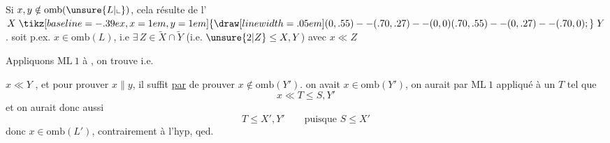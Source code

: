 Si $x,y\notin\mathrm{omb}(\unsure{L|\llcorner})$, cela résulte de l' $X\mathrel{\tikz[baseline=-.39ex,x=1em,y=1em]{\draw[line width=.05em] (0,.55)--(.70,.27)--(0,0) (.70,.55)--(0,.27)--(.70,0);}}Y$.   \unsure{)|,} soit p.ex. $x\in\mathrm{omb}(L)$,  i.e $\exists\,Z\in\widetilde X\cap\widetilde Y$ (i.e. $\unsure{2|Z}\leq X,Y$) avec $x\ll Z$

\unsure{[}Appliquons $\mathrm{ML}\ 1$ à
, on trouve 
i.e.
\deleted{donc $S\in\widetilde L\overset{\mathrm{def}}{=}\widetilde X\cap\widetilde Y$]}

  $x\ll Y$ , et pour prouver  $x\parallel y$, il suffit \uline{par}  de prouver $x\notin\mathrm{omb}(Y')$.   on avait $x\in\mathrm{omb}(Y')$, on aurait par $\mathrm{ML}\ 1$ appliqué à
un $T$ \deleted{\unsure{$\in$}} tel que
\[
 x\ll T\leq S,Y'
\]
et on aurait donc aussi
\[
 T\leq X',Y'\qquad\text{puisque } S\leq X'
\]
donc $x\in\mathrm{omb}(L')$, contrairement à l'hyp, qed.

